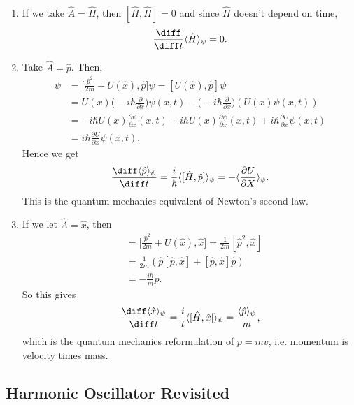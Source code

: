 \documentclass[12pt]{article}
\begin{document}
\begin{exbox}
	\begin{enumerate}[1.]
		\item If we take $\hat A = \hat H$, then $[\hat H, \hat H] = 0$ and since $\hat H$ doesn't depend on time,
			\[
				\frac{\diff}{\diff t} \langle \hat H \rangle_{\psi} = 0
			.\]
		\item Take $\hat A = \hat p$. Then,
			\begin{align*}
				[\hat H, \hat p]\psi &= \biggl[ \frac{\hat p^2}{2m} + U(\hat x), \hat p \biggr] \psi = [U(\hat x), \hat p] \psi \\
						     &= U(x) \biggl( - i \hbar \frac{\partial}{\partial x}\biggr) \psi(x, t) - \biggl( - i \hbar \frac{\partial}{\partial x}\biggr) (U(x)\psi(x, t)) \\
						     &= - i \hbar U(x) \frac{\partial \psi}{\partial x}(x, t) + i \hbar U(x) \frac{\partial \psi}{\partial x}(x, t) + i \hbar \frac{\partial U}{\partial x}\psi(x, t) \\
						     &= i \hbar \frac{\partial U}{\partial x} \psi(x, t).
			\end{align*}
			Hence we get
			\[
				\frac{\diff \langle \hat p \rangle_{\psi}}{\diff t} = \frac{i}{\hbar} \langle [\hat H, \hat p] \rangle_{\psi} = - \langle \frac{\partial U}{\partial X} \rangle_{\psi}
			.\]
			This is the quantum mechanics equivalent of Newton's second law.
		\item If we let $\hat A = \hat x$, then
			\begin{align*}
				[\hat H, \hat x] &= \biggl[ \frac{\hat p^2}{2m} + U(\hat x), \hat x\biggr] = \frac{1}{2m} [\hat p^2, \hat x] \\
						 &= \frac{1}{2m} (\hat p[\hat p, \hat x] + [\hat p, \hat x]\hat p) \\
						 &= - \frac{i \hbar}{m} \hat p.
			\end{align*}
			So this gives
			\[
				\frac{\diff \langle \hat x \rangle_{\psi}}{\diff t}= \frac{i}{t} \langle [\hat H, \hat x[ \rangle_{\psi} = \frac{\langle \hat p \rangle_{\psi}}{m}
			,\]
			which is the quantum mechanics reformulation of $p = mv$, i.e. momentum is velocity times mass.
	\end{enumerate}
\end{exbox}

\subsection{Harmonic Oscillator Revisited}%
\label{sub:harmonic_oscillator_revisited}
\end{document}
